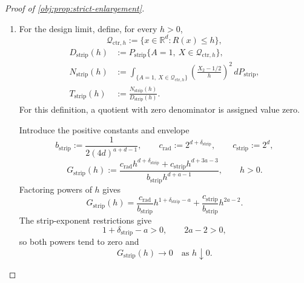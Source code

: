 \documentclass[11pt]{article}
\begin{document}
\begin{proof}[Proof of \cref{obj:prop:strict-enlargement}]
\begin{enumerate}
\item For the design limit, define, for every \(h>0\),
\[
\mathcal Q_{\mathrm{ctr},h}
:=\{x\in\mathbb R^d:R(x)\le h\},
\]
\[
\begin{aligned}
D_{\mathrm{strip}}(h)
&:=P_{\mathrm{strip}}\{A=1,\ X\in\mathcal Q_{\mathrm{ctr},h}\},\\
N_{\mathrm{strip}}(h)
&:=\int_{\{A=1,\ X\in\mathcal Q_{\mathrm{ctr},h}\}}
\left(\frac{X_2-1/2}{h}\right)^2\,dP_{\mathrm{strip}},\\
T_{\mathrm{strip}}(h)
&:=\frac{N_{\mathrm{strip}}(h)}{D_{\mathrm{strip}}(h)}.
\end{aligned}
\]
For this definition, a quotient with zero denominator is assigned value zero.

Introduce the positive constants and envelope
\[
b_{\mathrm{strip}}
:=\frac{1}{2(4d)^{a+d-1}},
\qquad
c_{\mathrm{rad}}:=2^{d+\delta_{\mathrm{strip}}},
\qquad
c_{\mathrm{strip}}:=2^d,
\]
\[
G_{\mathrm{strip}}(h)
:=
\frac{
c_{\mathrm{rad}}h^{d+\delta_{\mathrm{strip}}}
+c_{\mathrm{strip}}h^{d+3a-3}
}{
b_{\mathrm{strip}}h^{d+a-1}
},
\qquad h>0.
\]
Factoring powers of \(h\) gives
\[
G_{\mathrm{strip}}(h)
=
\frac{c_{\mathrm{rad}}}{b_{\mathrm{strip}}}
h^{1+\delta_{\mathrm{strip}}-a}
+
\frac{c_{\mathrm{strip}}}{b_{\mathrm{strip}}}
h^{2a-2}.
\]
The strip-exponent restrictions give
\[
1+\delta_{\mathrm{strip}}-a>0,
\qquad
2a-2>0,
\]
so both powers tend to zero and
\[
G_{\mathrm{strip}}(h)\longrightarrow0
\quad\text{as }h\downarrow0.
\]


\end{enumerate}
\end{proof}
\end{document}
